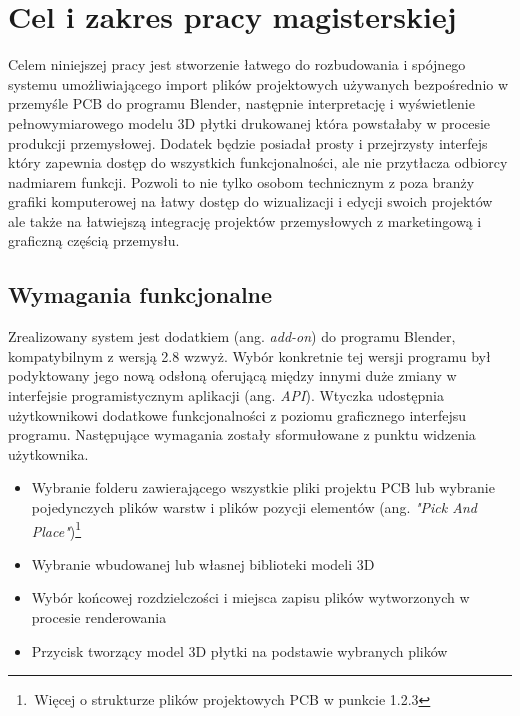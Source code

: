 \documentclass{xmgr}
\begin{document}

\chapter{Cel i zakres pracy magisterskiej}

Celem niniejszej pracy jest stworzenie łatwego do rozbudowania i spójnego systemu umożliwiającego import plików projektowych używanych bezpośrednio w przemyśle PCB do programu Blender, następnie interpretację i wyświetlenie pełnowymiarowego modelu 3D płytki drukowanej która powstałaby w procesie produkcji przemysłowej. Dodatek będzie posiadał prosty i przejrzysty interfejs który zapewnia dostęp do wszystkich funkcjonalności, ale nie przytłacza odbiorcy nadmiarem funkcji. Pozwoli to nie tylko osobom technicznym z poza branży grafiki komputerowej na łatwy dostęp do wizualizacji i edycji swoich projektów ale także na łatwiejszą integrację projektów przemysłowych z marketingową i graficzną częścią przemysłu.

\newpage

\section{Wymagania funkcjonalne}

Zrealizowany system jest dodatkiem (ang. \emph{add-on}) do programu Blender, kompatybilnym z wersją 2.8 wzwyż. Wybór konkretnie tej wersji programu był podyktowany jego nową odsłoną oferującą między innymi duże zmiany w interfejsie programistycznym aplikacji (ang. \emph{API}). Wtyczka udostępnia użytkownikowi dodatkowe funkcjonalności z poziomu graficznego interfejsu programu. Następujące wymagania zostały sformułowane z punktu widzenia użytkownika.
\begin{itemize}
\item Wybranie folderu zawierającego wszystkie pliki projektu PCB lub wybranie pojedynczych plików warstw i  plików pozycji elementów (ang. \emph{"Pick And Place"})\footnote{\,Więcej o strukturze plików projektowych PCB w punkcie 1.2.3}
\item Wybranie wbudowanej lub własnej biblioteki modeli 3D
\item Wybór końcowej rozdzielczości i miejsca zapisu plików wytworzonych w procesie renderowania
\item Przycisk tworzący model 3D płytki na podstawie wybranych plików
\end{itemize}
\end{document}
